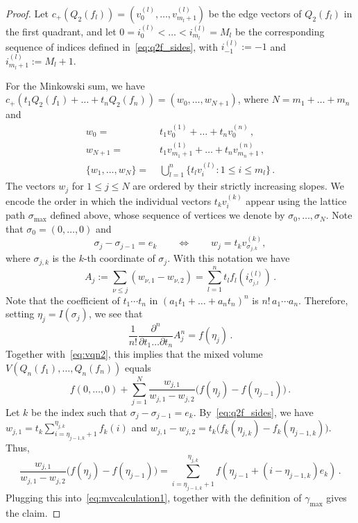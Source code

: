 \documentclass[10pt,a4paper]{amsart}
\begin{document}
\begin{proof}
Let $c_+(Q_2(f_l)) = (v_0^{(l)},\dots,v_{m_l+1}^{(l)})$ be the edge vectors of $Q_2(f_l)$ in the first quadrant, and let $0=i_0^{(l)}<\dots<i_{m_l}^{(l)}=M_l$ be the corresponding sequence of indices defined in~\eqref{eq:q2f_sides}, with $i_{-1}^{(l)}:=-1$ and $i_{m_l+1}^{(l)}:=M_l+1$.

For the Minkowski sum, we have $c_+(t_1Q_2(f_1)+\dots+t_nQ_2(f_n))=(w_0,\dots,w_{N+1})$, where $N=m_1+\dots+m_n$ and 
\begin{align*}
	w_0 =& \;t_1v_0^{(1)}+\dots+t_nv_0^{(n)}\,,\\
	w_{N+1} =& \;t_1v_{m_1+1}^{(1)}+\dots+t_nv_{m_n+1}^{(n)}\,,\\
	\{w_1,\dots,w_N\} =& \;\textstyle\bigcup_{l=1}^n\{t_lv_i^{(l)}\colon 1\le i \le m_l\}\,.
\end{align*}
The vectors $w_j$ for $1\le j\le N$ are ordered by their strictly increasing slopes. We encode the order in which the individual vectors $t_k v_i^{(k)}$ appear using the lattice path $\sigma_{\mathrm{max}}$ defined above, whose sequence of vertices we denote by $\sigma_0,\dots,\sigma_N$. Note that $\sigma_0 = (0,\dots,0)$ and
	\[\sigma_j-\sigma_{j-1}=e_k\qquad \Leftrightarrow \qquad w_j = t_k v_{\sigma_{j,k}}^{(k)},\]
where $\sigma_{j,k}$ is the $k$-th coordinate of $\sigma_j$.
With this notation we have
	\[A_j:=\sum_{\nu\le j}(w_{\nu,1}-w_{\nu,2}) = \sum_{l=1}^{n}t_l f_l(i_{\sigma_{j,l}}^{(l)})\,.\]
Note that the coefficient of $t_1\cdots t_n$ in $(a_1t_1+\dots+a_nt_n)^n$ is $n!\,a_1\cdots a_n$. Therefore, setting $\eta_j = I(\sigma_j)$, we see that
	\[\frac{1}{n!}\frac{\partial^n}{\partial{t_1}\dots\partial{t_n}}A_j^n = f(\eta_j)\,.\]
Together with~\eqref{eq:vqn2}, this implies that the mixed volume $V(Q_n(f_1),\dots,Q_n(f_n))$ equals
	\begin{equation} \label{eq:mvcalculation1}
	f(0,\dots,0)+\sum_{j=1}^{N}\frac{w_{j,1}}{w_{j,1}-w_{j,2}}\big(f(\eta_j)-f(\eta_{j-1})\big)\,.
	\end{equation}
Let $k$ be the index such that $\sigma_j-\sigma_{j-1}=e_k$. By~\eqref{eq:q2f_sides}, we have $w_{j,1} = t_k \sum_{i=\eta_{j-1,k}+1}^{\eta_{j,k}} f_k(i)$ and $w_{j,1}-w_{j,2} = t_k \big(f_k(\eta_{j,k}) - f_k(\eta_{j-1,k})\big)$. Thus,
	\[\frac{w_{j,1}}{w_{j,1}-w_{j,2}}\big(f(\eta_j)-f(\eta_{j-1})\big) = 
	\sum_{i=\eta_{j-1,k}+1}^{\eta_{j,k}} f(\eta_{j-1} + (i - \eta_{j-1,k}) e_k)\,.\]
Plugging this into~\eqref{eq:mvcalculation1}, together with the definition of $\gamma_{\mathrm{max}}$ gives the claim.
\end{proof}
\end{document}
